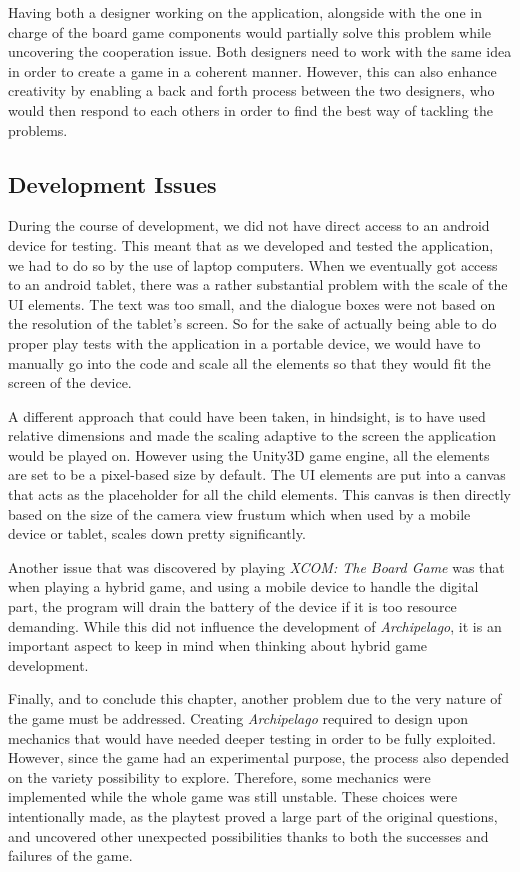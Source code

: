 Having both a designer working on the application, alongside with the one in charge of the board game components would partially solve this problem while uncovering the cooperation issue. Both designers need to work with the same idea in order to create a game in a coherent manner. However, this can also enhance creativity by enabling a back and forth process between the two designers, who would then respond to each others in order to find the best way of tackling the problems. 

\subsection{Development Issues}
During the course of development, we did not have direct access to an android device for testing. This meant that as we developed and tested the application, we had to do so by the use of laptop computers. When we eventually got access to an android tablet, there was a rather substantial problem with the scale of the UI elements. The text was too small, and the dialogue boxes were not based on the resolution of the tablet's screen. So for the sake of actually being able to do proper play tests with the application in a portable device, we would have to manually go into the code and scale all the elements so that they would fit the screen of the device. 

A different approach that could have been taken, in hindsight, is to have used relative dimensions and made the scaling adaptive to the screen the application would be played on. However using the Unity3D game engine, all the elements are set to be a pixel-based size by default. The UI elements are put into a canvas that acts as the placeholder for all the child elements. This canvas is then directly based on the size of the camera view frustum which when used by a mobile device or tablet, scales down pretty significantly. 

Another issue that was discovered by playing \textit{XCOM: The Board Game} \cite{game:xcomtbg} was that when playing a hybrid game, and using a mobile device to handle the digital part, the program will drain the battery of the device if it is too resource demanding. While this did not influence the development of \textit{Archipelago}, it is an important aspect to keep in mind when thinking about hybrid game development.

Finally, and to conclude this chapter, another problem due to the very nature of the game must be addressed. Creating \textit{Archipelago} required to design upon mechanics that would have needed deeper testing in order to be fully exploited. However, since the game had an experimental purpose, the process also depended on the variety possibility to explore. Therefore, some mechanics were implemented while the whole game was still unstable. These choices were intentionally made, as the playtest proved a large part of the original questions, and uncovered other unexpected possibilities thanks to both the successes and failures of the game. 